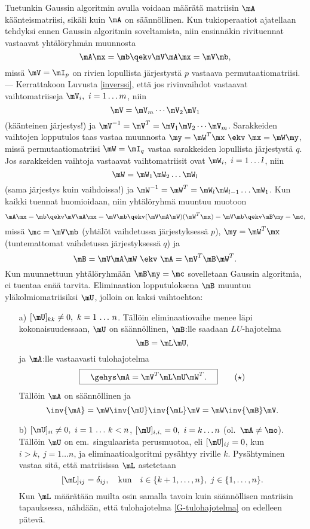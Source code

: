 Tuetunkin Gaussin algoritmin avulla voidaan määrätä matriisin $\mA$ käänteismatriisi, sikäli 
kuin $\mA$ on säännöllinen. Kun tukioperaatiot ajatellaan tehdyksi ennen Gaussin algoritmin 
soveltamista, niin ensinnäkin rivituennat vastaavat yhtälöryhmän muunnosta
\[
\mA\mx=\mb \qekv \mV\mA\mx = \mV\mb,
\]
missä $\mV=\mI_p$ on rivien lopullista järjestystä $p$ vastaava permutaatiomatriisi.
--- Kerrattakoon Luvusta \ref{inverssi}, että jos rivinvaihdot vastaavat vaihtomatriiseja
$\mV_i,\ i=1 \ldots m$, niin
\[
\mV = \mV_m \cdots \mV_2\mV_1
\]
(käänteinen järjestys!) ja $\mV^{-1}=\mV^T=\mV_1\mV_2 \cdots \mV_m$. Sarakkeiden vaihtojen
lopputulos taas vastaa muunnosta $\my=\mW^T\mx\ \ekv\ \mx=\mW\my$, missä permutaatiomatriisi
$\mW=\mI_q$ vastaa sarakkeiden lopullista järjestystä $q$. Jos sarakkeiden vaihtoja vastaavat
vaihtomatriisit ovat $\mW_i,\ i=1 \ldots l$, niin
\[
\mW=\mW_1\mW_2 \ldots \mW_l
\]
(sama järjestys kuin vaihdoissa!) ja $\mW^{-1}=\mW^T=\mW_l\mW_{l-1} \ldots \mW_1$. Kun kaikki
tuennat huomioidaan, niin yhtälöryhmä muuntuu muotoon
\[
\mA\mx=\mb \qekv \mV\mA\mx=\mV\mb \qekv (\mV\mA\mW)(\mW^T\mx) = \mV\mb \qekv \mB\my=\mc,
\]
missä $\mc=\mV\mb$ (yhtälöt vaihdetussa järjestyksessä $p$), $\my=\mW^T\mx$ (tuntemattomat
vaihdetussa järjestyksessä $q$) ja
\[
\mB=\mV\mA\mW\ \ekv\ \mA = \mV^T\mB\mW^T.
\]
Kun muunnettuun yhtälöryhmään $\mB\my=\mc$ sovelletaan Gaussin algoritmia, ei tuentaa enää 
tarvita. Eliminaation lopputuloksena $\mB$ muuntuu yläkolmiomatriisiksi $\mU$, jolloin on kaksi
vaihtoehtoa:
\begin{itemize}
\item[a)] $[\mU]_{kk} \neq 0,\ k=1\,\ldots\,n$. Tällöin eliminaatiovaihe menee läpi 
          kokonaisuudessaan, $\mU$ on säännöllinen, $\mB$:lle saadaan $LU$-hajotelma
          \[
          \mB = \mL\mU,
          \]
          ja $\mA$:lle vastaavasti tulohajotelma
          \begin{equation} \label{G-tulohajotelma}
          \boxed{\quad\gehys \mA = \mV^T\mL\mU\mW^T.\quad} \tag{$\star$}
          \end{equation}
          Tällöin $\mA$ on säännöllinen ja
          \[
          \inv{\mA} = \mW\inv{\mU}\inv{\mL}\mV = \mW\inv{\mB}\mV.
          \]
\item[b)] $[\mU]_{ii} \neq 0,\ i=1\,\ldots\,k<n$, $[\mU]_{i,i,}=0,\ i=k \ldots n$
          (ol.\ $\mA\neq\mo$). Tällöin $\mU$ on em.\ singulaarista perusmuotoa, eli
          $[\mU]_{ij}=0$, kun $i>k, \ j=1 \ldots n$, ja eliminaatioalgoritmi pysähtyy
          riville $k$. Pysähtyminen vastaa sitä, että matriisissa $\mL$ astetetaan
          \[
          [\mL]_{ij} = \delta_{ij}, \quad 
                      \text{kun} \quad i \in \{k+1, \ldots, n\}, \ j \in \{1, \ldots, n\}.
          \]
          Kun $\mL$ määrätään muilta osin samalla tavoin kuin säännöllisen matriisin 
          tapauksessa, nähdään, että tulohajotelma \eqref{G-tulohajotelma} on edelleen pätevä.
\end{itemize}
